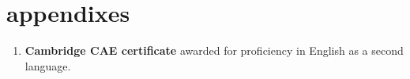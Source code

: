 \documentclass[]{friggeri-cv} %
\begin{document}

\section{appendixes}
\begin{enumerate}
	\item \textbf{Cambridge CAE certificate} awarded for proficiency in English as a second language.
\end{enumerate}
\newpage
\appendix


\end{document}
